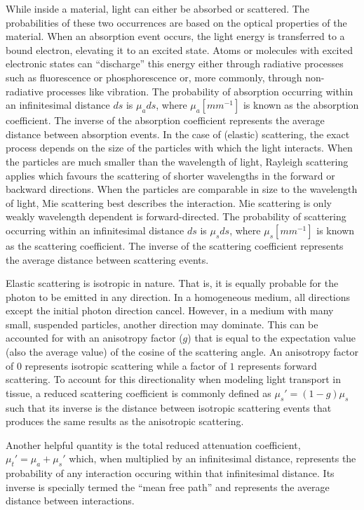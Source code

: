 While inside a material, light can either be absorbed or scattered. The probabilities of these two occurrences are based on the optical properties of the material. When an absorption event occurs, the light energy is transferred to a bound electron, elevating it to an excited state.\cite{Jacques2004} Atoms or molecules with excited electronic states can ``discharge'' this energy either through radiative processes such as fluorescence or phosphorescence or, more commonly, through non-radiative processes like vibration. The probability of absorption occurring within an infinitesimal distance $ds$ is $\mu_ads$, where $\mu_a [mm^{-1}]$ is known as the absorption coefficient. The inverse of the absorption coefficient represents the average distance between absorption events. In the case of (elastic) scattering, the exact process depends on the size of the particles with which the light interacts. When the particles are much smaller than the wavelength of light, Rayleigh scattering applies which favours the scattering of shorter wavelengths in the forward or backward directions.\cite{Prasad2003} When the particles are comparable in size to the wavelength of light, Mie scattering best describes the interaction. Mie scattering is only weakly wavelength dependent is forward-directed.\cite{Jacques2004} The probability of scattering occurring within an infinitesimal distance $ds$ is $\mu_sds$, where $\mu_s [mm^{-1}]$ is known as the scattering coefficient. The inverse of the scattering coefficient represents the average distance between scattering events.

Elastic scattering is isotropic in nature. That is, it is equally probable for the photon to be emitted in any direction. In a homogeneous medium, all directions except the initial photon direction cancel. However, in a medium with many small, suspended particles, another direction may dominate. This can be accounted for with an anisotropy factor ($g$) that is equal to the expectation value (also the average value) of the cosine of the scattering angle. An anisotropy factor of $0$ represents isotropic scattering while a factor of $1$ represents forward scattering. To account for this directionality when modeling light transport in tissue, a reduced scattering coefficient is commonly defined as $\mu_s'=(1-g)\mu_s$ such that its inverse is the distance between isotropic scattering events that produces the same results as the anisotropic scattering.\cite{Gratton2004}

Another helpful quantity is the total reduced attenuation coefficient, $\mu_t'=\mu_a + \mu_s'$ which, when multiplied by an infinitesimal distance, represents the probability of any interaction occuring within that infinitesimal distance. Its inverse is specially termed the ``mean free path'' and represents the average distance between interactions.\cite{Farrell2003}

